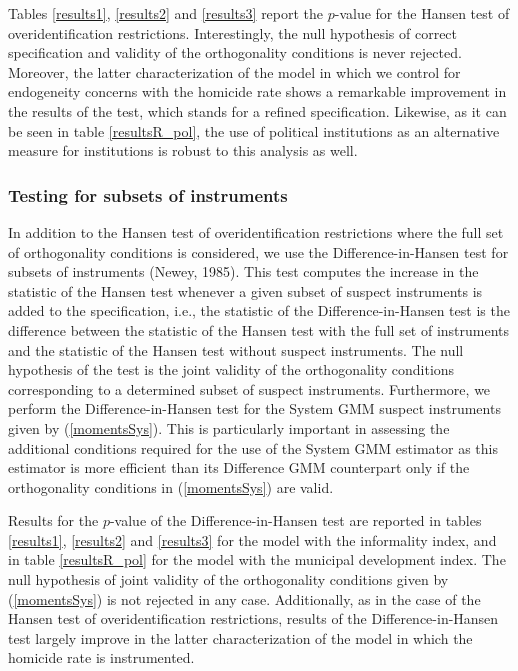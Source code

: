 Tables \ref{results1}, \ref{results2} and \ref{results3} report the $p$-value for the Hansen test of overidentification restrictions. Interestingly, the null hypothesis of correct specification and validity of the orthogonality conditions is never rejected. Moreover, the latter characterization of the model in which we control for endogeneity concerns with the homicide rate shows a remarkable improvement in the results of the test, which stands for a refined specification. Likewise, as it can be seen in table \ref{resultsR_pol}, the use of political institutions as an alternative measure for institutions is robust to this analysis as well.

\subsubsection*{Testing for subsets of instruments}

In addition to the Hansen test of overidentification restrictions where the full set of orthogonality conditions is considered, we use the Difference-in-Hansen test for subsets of instruments (Newey, 1985). This test computes the increase in the statistic of the Hansen test whenever a given subset of suspect instruments is added to the specification, i.e., the statistic of the Difference-in-Hansen test is the difference between the statistic of the Hansen test with the full set of instruments and the statistic of the Hansen test without suspect instruments. The null hypothesis of the test is the joint validity of the orthogonality conditions corresponding to a determined subset of suspect instruments. Furthermore, we perform the Difference-in-Hansen test for the System GMM suspect instruments given by (\ref{momentsSys}). This is particularly important in assessing the additional conditions required for the use of the System GMM estimator as this estimator is more efficient than its Difference GMM counterpart only if the orthogonality conditions in (\ref{momentsSys}) are valid.

Results for the $p$-value of the Difference-in-Hansen test are reported in tables \ref{results1}, \ref{results2} and \ref{results3} for the model with the informality index, and in table \ref{resultsR_pol} for the model with the municipal development index. The null hypothesis of joint validity of the orthogonality conditions given by (\ref{momentsSys}) is not rejected in any case. Additionally, as in the case of the Hansen test of overidentification restrictions, results of the Difference-in-Hansen test largely improve in the latter characterization of the model in which the homicide rate is instrumented.

